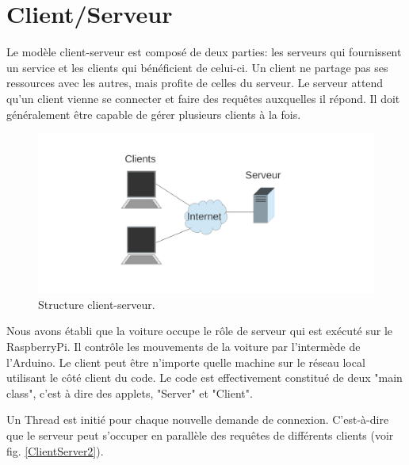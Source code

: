 \documentclass[a4paper,11pt]{report}
\begin{document}
{\section{Client/Serveur\label{ClientServeur}}


Le modèle client-serveur est composé de deux parties: les serveurs qui fournissent un service et les clients qui bénéficient de celui-ci. Un client ne partage pas ses ressources avec les autres, mais profite de celles du serveur. Le serveur attend qu'un client vienne se connecter et faire des requêtes auxquelles il répond. Il doit généralement être capable de gérer plusieurs clients à la fois.

\begin{figure}[h]
\includegraphics[width=1.0\textwidth]{Client_Server1.pdf}
\caption[Structure client-serveur]{\label{ClientServer1}Structure client-serveur.}
\end{figure}

Nous avons établi que la voiture occupe le rôle de serveur qui est exécuté sur le RaspberryPi. Il contrôle les mouvements de la voiture par l'intermède de l'Arduino. Le client peut être n'importe quelle machine sur le réseau local utilisant le côté client du code. Le code est effectivement constitué de deux "main class", c'est à dire des applets, "Server" et "Client".  

Un Thread est initié pour chaque nouvelle demande de connexion. C'est-à-dire que le serveur peut s'occuper en parallèle des requêtes de différents clients (voir fig. \ref{ClientServer2}). 

}
\end{document}
